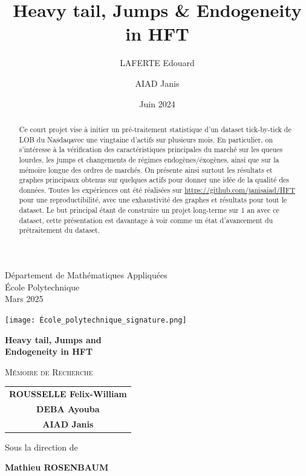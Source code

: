 \documentclass[10pt,a4paper]{article}
\title{\huge\textbf{Heavy tail, Jumps & Endogeneity in HFT}}
\author{LAFERTE Edouard \and AIAD Janis}
\date{Juin 2024}
\theoremstyle{definition}
\theoremstyle{remark}
\begin{document}
    \begin{titlepage}
        \begin{center}
            \vspace*{1cm}
            {\large Département de Mathématiques Appliquées\\
            École Polytechnique\\[0.4cm]
            Mars 2025\par}

            
                \texttt{[image: École\_polytechnique\_signature.png]}
            

            
            {\huge\bfseries Heavy tail, Jumps and \\[0.4cm] 
            Endogeneity in HFT \par}
            
            \vspace{1.0cm}
            
            {\Large\textsc{Mémoire de Recherche}\par}
            \vspace{0.8cm}
            
            {\large
            \begin{tabular}{c}
                \textbf{ROUSSELLE Felix-William}\\[0.2cm]
                \textbf{DEBA Ayouba}\\[0.2cm]
                \textbf{AIAD Janis}
            \end{tabular}\par}
            
            \vspace{0.4cm}
            
            {\large Sous la direction de\par}
            \vspace{0.4cm}
            {\large\textbf{Mathieu ROSENBAUM}\par}
            
    \vspace{0.5cm}

            \begin{minipage}{0.8\textwidth}
            \begin{abstract}
    Ce court projet vise à initier un pré-traitement statistique d'un dataset tick-by-tick de LOB du Nasdaqavec une vingtaine d'actifs sur plusieurs mois. En particulier, on s'intéresse à la vérification des caractéristiques principales du marché sur les queues lourdes, les jumps et changements de régimes endogènes/éxogènes, ainsi que 
    sur la mémoire longue des ordres de marchés.
    On présente ainsi surtout les résultats et graphes principaux obtenus sur quelques actifs pour donner une idée de la qualité des données.
    Toutes les expériences ont été réalisées sur \url{https://github.com/janisaiad/HFT} pour une reproductibilité, avec une exhaustivité des graphes et résultats pour tout le dataset.
    Le but principal étant de construire un projet long-terme sur 1 an avec ce dataset, cette présentation est davantage à voir comme un état d'avancement du prétraitement du dataset.


\end{abstract}
\end{minipage}
\end{center}
\end{titlepage}
\end{document}
